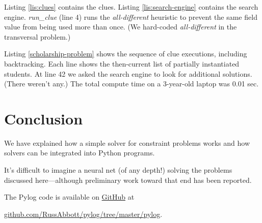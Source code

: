 Listing \ref{lis:clues} contains the clues. Listing \ref{lis:search-engine} contains the search engine.  \textit{run\_clue} (line 4) runs the \textit{all-different} heuristic to prevent the same field value from being used more than once. (We hard-coded \textit{all-different} in the transversal problem.)

Listing \ref{scholarship-problem} shows the sequence of clue executions, including backtracking. Each line shows the then-current list of partially instantiated students. At line 42 we asked the search engine to look for additional solutions. (There weren't any.) The total compute time on a 3-year-old laptop was 0.01 sec. 

\section{Conclusion} \label{sec:conclusion}

We have explained how a simple solver for constraint problems works and how solvers can be integrated into Python programs. 

It's difficult to imagine a neural net (of any depth!) solving the problems discussed here---although preliminary work toward that end has been reported. \cite{xu2018towards, amel2019shallow, dubois2019towards}


\largev
The Pylog code is available on \href{https://github.com/RussAbbott/pylog/tree/master/pylog}{GitHub} at

\href{https://github.com/RussAbbott/pylog/tree/master/pylog}{github.com/RussAbbott/pylog/tree/master/pylog}.

